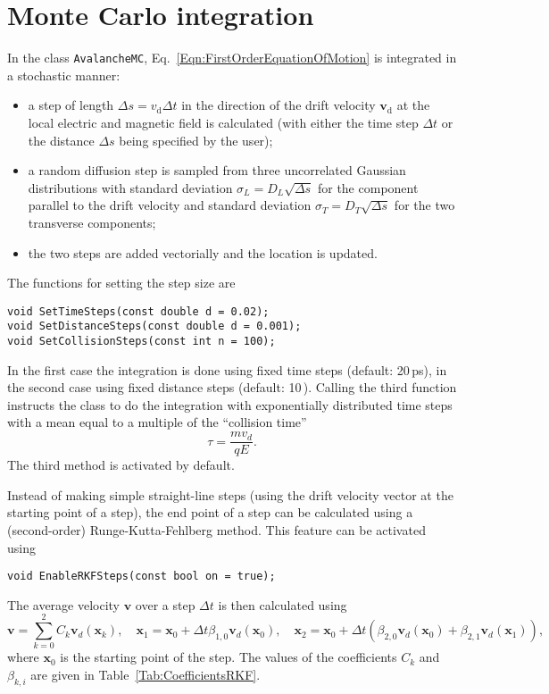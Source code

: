 \section{Monte Carlo integration}\label{Sec:DriftLineMC}
In the class \texttt{AvalancheMC}, Eq.~\eqref{Eqn:FirstOrderEquationOfMotion}
is integrated in a stochastic manner:
\begin{itemize}
  \item
  a step of length \(\Delta{s} = v_{\text{d}}\Delta{t}\) 
  in the direction of the
  drift velocity \(\mathbf{v}_{\text{d}}\) 
  at the local electric and magnetic field is calculated (with either the 
  time step \(\Delta{t}\) or the distance \(\Delta{s}\) 
  being specified by the user);
  \item
   a random diffusion step
   is sampled from three uncorrelated Gaussian distributions
   with standard deviation \(\sigma_{L} = D_{L}\sqrt{\Delta{s}}\)
   for the component parallel to the drift velocity and
   standard deviation
   \(\sigma_{T} = D_{T}\sqrt{\Delta{s}}\) for the two
   transverse components;
   \item
   the two steps are added vectorially and the location is updated.
\end{itemize}
The functions for setting the step size are 
\begin{lstlisting}
void SetTimeSteps(const double d = 0.02);
void SetDistanceSteps(const double d = 0.001);
void SetCollisionSteps(const int n = 100);
\end{lstlisting} 
In the first case the integration is done 
using fixed time steps (default: 20\,ps), 
in the second case using fixed distance steps (default: 10\,). 
Calling the third function instructs the class to 
do the integration with exponentially distributed time steps 
with a mean equal to a multiple of the ``collision time'' 
\begin{equation*}
  \tau = \frac{m v_{d}}{q E}.
\end{equation*}
The third method is activated by default. 

Instead of making simple straight-line steps (using the drift velocity 
vector at the starting point of a step), the end point of a step 
can be calculated using a (second-order) Runge-Kutta-Fehlberg method. 
This feature can be activated using
\begin{lstlisting}
void EnableRKFSteps(const bool on = true); 
\end{lstlisting}
The average velocity $\mathbf{v}$ over a step $\Delta{t}$ is then 
calculated using
\begin{equation*}
\mathbf{v} = \sum\limits_{k=0}^{2}C_{k}\mathbf{v}_{d}\left(\mathbf{x}_{k}\right), \quad 
\mathbf{x}_{1} = \mathbf{x}_{0} + \Delta{t}\beta_{1,0}\mathbf{v}_{d}\left(\mathbf{x}_{0}\right), \quad 
\mathbf{x}_{2} = \mathbf{x}_{0} + \Delta{t}\left(\beta_{2,0}\mathbf{v}_{d}\left(\mathbf{x}_{0}\right) + \beta_{2,1}\mathbf{v}_{d}\left(\mathbf{x}_{1}\right)\right),
\end{equation*}
where $\mathbf{x}_{0}$ is the starting point of the step. The values of the 
coefficients $C_{k}$ and $\beta_{k,i}$ are given in 
Table~\ref{Tab:CoefficientsRKF}.

